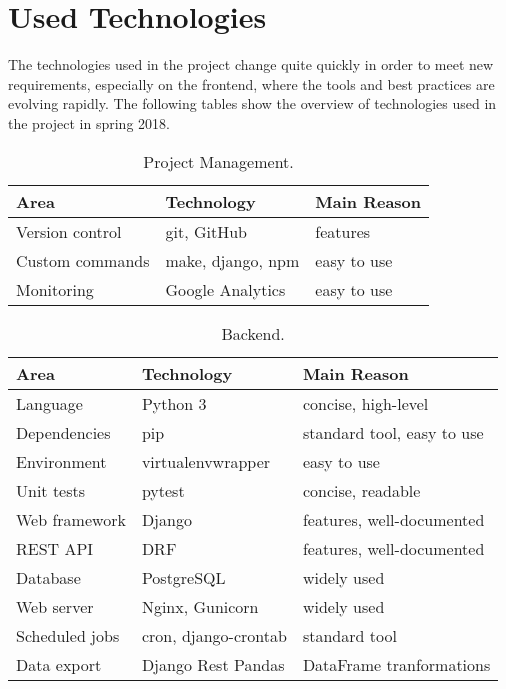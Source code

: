 \chapter{Used Technologies}
\label{chap:technologies}

The technologies used in the project change quite quickly in order to meet new requirements,
especially on the frontend, where the tools and best practices are evolving rapidly.
The following tables show the overview of technologies used in the project in spring 2018.


\begin{table}[htb]
\centering
\caption{Project Management.}
\begin{tabular}{l l l}
\toprule
Area & Technology & Main Reason  \\
\midrule
Version control & git, GitHub & features \\
Custom commands & make, django, npm & easy to use \\
Monitoring & Google Analytics & easy to use \\
\bottomrule
\end{tabular}
\end{table}

\begin{table}[htb]
\centering
\caption{Backend.}
\begin{tabular}{l l l}
\toprule
Area & Technology & Main Reason  \\
\midrule
Language & Python 3 & concise, high-level \\
Dependencies & pip & standard tool, easy to use \\
Environment & virtualenvwrapper & easy to use \\
Unit tests & pytest & concise, readable \\
Web framework & Django & features, well-documented \\
REST API & DRF & features, well-documented \\
Database & PostgreSQL & widely used \\
Web server & Nginx, Gunicorn & widely used \\
Scheduled jobs & cron, django-crontab & standard tool \\
Data export & Django Rest Pandas & DataFrame tranformations \\ %
\bottomrule
\end{tabular}
\end{table}

